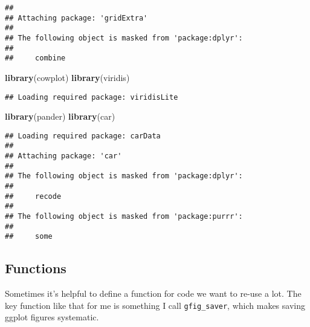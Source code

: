 \documentclass[
]{article}
\newenvironment{Shaded}{\begin{snugshade}}{\end{snugshade}}
\newcommand{\FunctionTok}[1]{\textcolor[rgb]{0.13,0.29,0.53}{\textbf{#1}}}
\newcommand{\NormalTok}[1]{#1}
\begin{document}
\begin{verbatim}
## 
## Attaching package: 'gridExtra'
## 
## The following object is masked from 'package:dplyr':
## 
##     combine
\end{verbatim}

\begin{Shaded}
\begin{Highlighting}[]
\FunctionTok{library}\NormalTok{(cowplot)}
\FunctionTok{library}\NormalTok{(viridis)}
\end{Highlighting}
\end{Shaded}

\begin{verbatim}
## Loading required package: viridisLite
\end{verbatim}

\begin{Shaded}
\begin{Highlighting}[]
\FunctionTok{library}\NormalTok{(pander)}
\FunctionTok{library}\NormalTok{(car)}
\end{Highlighting}
\end{Shaded}

\begin{verbatim}
## Loading required package: carData
## 
## Attaching package: 'car'
## 
## The following object is masked from 'package:dplyr':
## 
##     recode
## 
## The following object is masked from 'package:purrr':
## 
##     some
\end{verbatim}

\hypertarget{functions}{%
\subsection{Functions}\label{functions}}

Sometimes it's helpful to define a function for code we want to re-use a
lot. The key function like that for me is something I call
\texttt{gfig\_saver}, which makes saving ggplot figures systematic.
\end{document}
